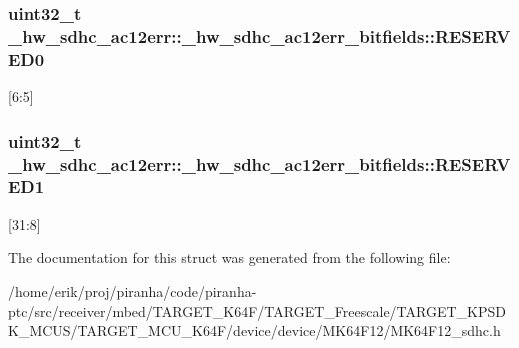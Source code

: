 \subsubsection[{\texorpdfstring{R\+E\+S\+E\+R\+V\+E\+D0}{RESERVED0}}]{\setlength{\rightskip}{0pt plus 5cm}uint32\+\_\+t \+\_\+hw\+\_\+sdhc\+\_\+ac12err\+::\+\_\+hw\+\_\+sdhc\+\_\+ac12err\+\_\+bitfields\+::\+R\+E\+S\+E\+R\+V\+E\+D0}\hypertarget{struct__hw__sdhc__ac12err_1_1__hw__sdhc__ac12err__bitfields_a6c666d770a494539f468f7f2f7f6bcbb}{}\label{struct__hw__sdhc__ac12err_1_1__hw__sdhc__ac12err__bitfields_a6c666d770a494539f468f7f2f7f6bcbb}
\mbox{[}6\+:5\mbox{]} 
\subsubsection[{\texorpdfstring{R\+E\+S\+E\+R\+V\+E\+D1}{RESERVED1}}]{\setlength{\rightskip}{0pt plus 5cm}uint32\+\_\+t \+\_\+hw\+\_\+sdhc\+\_\+ac12err\+::\+\_\+hw\+\_\+sdhc\+\_\+ac12err\+\_\+bitfields\+::\+R\+E\+S\+E\+R\+V\+E\+D1}\hypertarget{struct__hw__sdhc__ac12err_1_1__hw__sdhc__ac12err__bitfields_a700f9c77dd513820fbb5d6c5d1fa6961}{}\label{struct__hw__sdhc__ac12err_1_1__hw__sdhc__ac12err__bitfields_a700f9c77dd513820fbb5d6c5d1fa6961}
\mbox{[}31\+:8\mbox{]} 

The documentation for this struct was generated from the following file\+:\begin{DoxyCompactItemize}
\item 
/home/erik/proj/piranha/code/piranha-\/ptc/src/receiver/mbed/\+T\+A\+R\+G\+E\+T\+\_\+\+K64\+F/\+T\+A\+R\+G\+E\+T\+\_\+\+Freescale/\+T\+A\+R\+G\+E\+T\+\_\+\+K\+P\+S\+D\+K\+\_\+\+M\+C\+U\+S/\+T\+A\+R\+G\+E\+T\+\_\+\+M\+C\+U\+\_\+\+K64\+F/device/device/\+M\+K64\+F12/M\+K64\+F12\+\_\+sdhc.\+h\end{DoxyCompactItemize}
